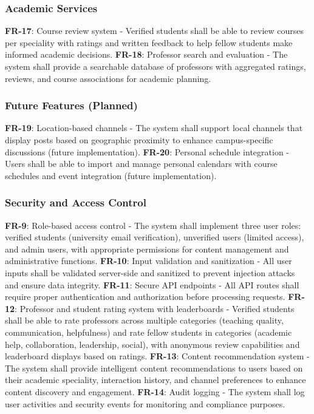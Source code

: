 \subsubsection{Academic Services}

     \textbf{FR-17}: Course review system - Verified students shall be able to review courses per speciality with ratings and written feedback to help fellow students make informed academic decisions.
     \textbf{FR-18}: Professor search and evaluation - The system shall provide a searchable database of professors with aggregated ratings, reviews, and course associations for academic planning.


\subsubsection{Future Features (Planned)}

     \textbf{FR-19}: Location-based channels - The system shall support local channels that display posts based on geographic proximity to enhance campus-specific discussions (future implementation).
     \textbf{FR-20}: Personal schedule integration - Users shall be able to import and manage personal calendars with course schedules and event integration (future implementation).


\subsubsection{Security and Access Control}
     \textbf{FR-9}: Role-based access control - The system shall implement three user roles: verified students (university email verification), unverified users (limited access), and admin users, with appropriate permissions for content management and administrative functions.
     \textbf{FR-10}: Input validation and sanitization - All user inputs shall be validated server-side and sanitized to prevent injection attacks and ensure data integrity.
     \textbf{FR-11}: Secure API endpoints \cite{supabase} - All API routes shall require proper authentication and authorization before processing requests.
     \textbf{FR-12}: Professor and student rating system with leaderboards - Verified students shall be able to rate professors across multiple categories (teaching quality, communication, helpfulness) and rate fellow students in categories (academic help, collaboration, leadership, social), with anonymous review capabilities and leaderboard displays based on ratings.
     \textbf{FR-13}: Content recommendation system - The system shall provide intelligent content recommendations to users based on their academic speciality, interaction history, and channel preferences to enhance content discovery and engagement.
     \textbf{FR-14}: Audit logging - The system shall log user activities and security events for monitoring and compliance purposes.


